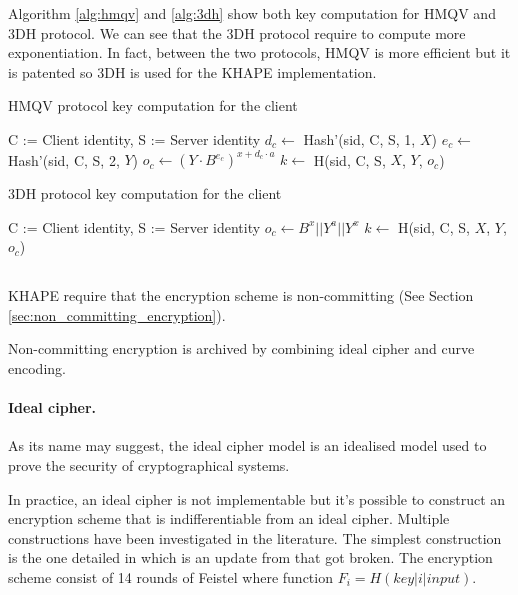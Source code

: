 \documentclass[../report.tex]{subfiles}
\begin{document}
Algorithm \ref{alg:hmqv} and \ref{alg:3dh} show both key computation for HMQV and 3DH protocol. We can see that the 3DH protocol require to compute more exponentiation.
In fact, between the two protocols, HMQV is more efficient but it is patented so 3DH is used for the KHAPE implementation.

\begin{algorithm}
\caption{HMQV protocol key computation for the client}
\label{alg:hmqv}

\begin{algorithmic}
\Require C := Client identity, S := Server identity
\State $d_c \gets$ Hash'(sid, C, S, 1, $X$)
\State $e_c \gets$ Hash'(sid, C, S, 2, $Y$)
\State $o_c \gets (Y \cdot B^{e_c})^{x+d_c \cdot a}$
\State $k \gets$ H(sid, C, S, $X$, $Y$, $o_c$)
\end{algorithmic}
\end{algorithm}

\begin{algorithm}
\caption{3DH protocol key computation for the client}
\label{alg:3dh}

\begin{algorithmic}
\Require C := Client identity, S := Server identity
\State $o_c \gets B^x || Y^a || Y^x$
\State $k \gets$ H(sid, C, S, $X$, $Y$, $o_c$)
\end{algorithmic}
\end{algorithm}







\subsection{}
KHAPE require that the encryption scheme is non-committing (See Section \ref{sec:non_committing_encryption}).

Non-committing encryption is archived by combining ideal cipher and curve encoding.

\paragraph{Ideal cipher.}
As its name may suggest, the ideal cipher model is an idealised model used to prove the security of cryptographical systems.

In practice, an ideal cipher is not implementable %
but it's possible to construct an encryption scheme that is indifferentiable from an ideal cipher. Multiple constructions have been investigated in the literature.
The simplest construction is the one detailed in \cite{Ideal_Cipher_2} which is an update from \cite{Ideal_Cipher_1} that got broken.
The encryption scheme consist of 14 rounds of Feistel where function $F_i = H(key | i | input)$.
\end{document}

